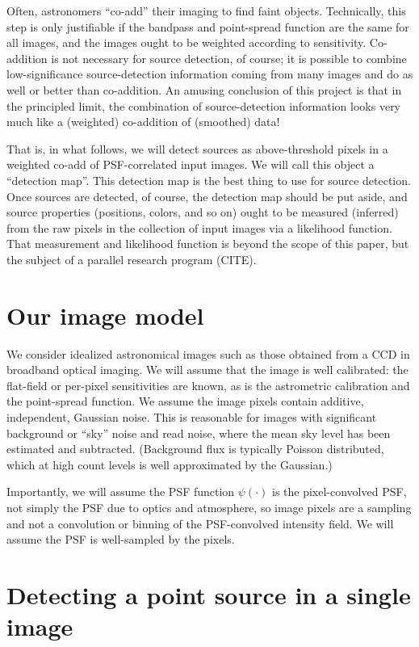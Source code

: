 \documentclass[letterpaper,preprint]{aastex}
\begin{document}
Often, astronomers ``co-add'' their imaging to find faint objects.
Technically, this step is only justifiable if the bandpass and
point-spread function are the same for all images, and the images
ought to be weighted according to sensitivity.
Co-addition is not necessary for source detection, of course; it is
possible to combine low-significance source-detection information
coming from many images and do as well or better than co-addition.
An amusing conclusion of this project is that in the principled limit,
the combination of source-detection information looks very much like a
(weighted) co-addition of (smoothed) data!

That is, in what follows, we will detect sources as above-threshold
pixels in a weighted co-add of PSF-correlated input images.
We will call this object a ``detection map''.
This detection map is the best thing to use for source detection.
Once sources are detected, of course, the detection map should be put
aside, and source properties (positions, colors, and so on) ought to
be measured (inferred) from the raw pixels in the collection of input
images via a likelihood function.
That measurement and likelihood function is beyond the scope of this
paper, but the subject of a parallel research program (CITE).

\section{Our image model}

We consider idealized astronomical images such as those obtained from
a CCD in broadband optical imaging.
%
We will assume that the image is well calibrated: the flat-field or
per-pixel sensitivities are known, as is the astrometric calibration
and the point-spread function.
%
We assume the image pixels contain additive, independent, Gaussian
noise.  This is reasonable for images with significant background or
``sky'' noise and read noise, where the mean sky level has been
estimated and subtracted.  (Background flux is typically Poisson
distributed, which at high count levels is well approximated by the
Gaussian.)
%

Importantly, we will assume the PSF function $\psi(\cdot)$ is the
pixel-convolved PSF, not simply the PSF due to optics and atmosphere,
so image pixels are a sampling and not a convolution or binning of the
PSF-convolved intensity field.
We will assume the PSF is well-sampled by the pixels.

\section{Detecting a point source in a single image}
\end{document}
